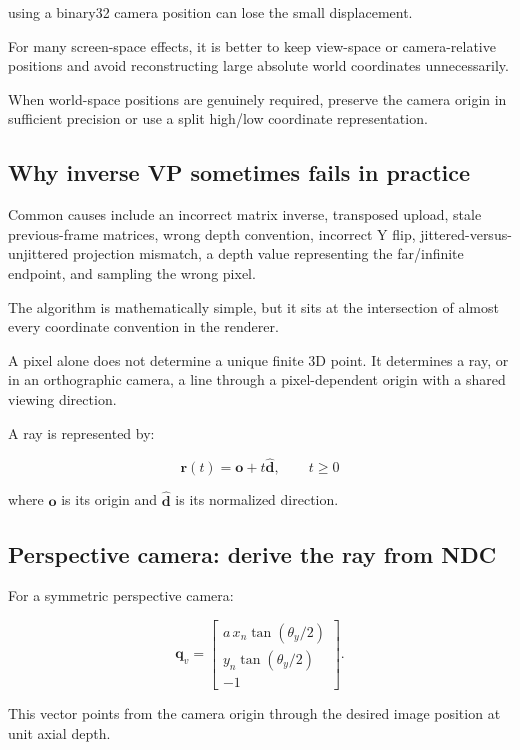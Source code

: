 using a binary32 camera position can lose the small displacement.

For many screen-space effects, it is better to keep view-space or camera-relative positions and avoid reconstructing large absolute world coordinates unnecessarily.

When world-space positions are genuinely required, preserve the camera origin in sufficient precision or use a split high/low coordinate representation.

\subsection{Why inverse VP sometimes fails in practice}\label{02-foundations-ii-ch035-why-inverse-vp-sometimes-fails-in-practice}

Common causes include an incorrect matrix inverse, transposed upload, stale previous-frame matrices, wrong depth convention, incorrect Y flip, jittered-versus-unjittered projection mismatch, a depth value representing the far/infinite endpoint, and sampling the wrong pixel.

The algorithm is mathematically simple, but it sits at the intersection of almost every coordinate convention in the renderer.

A pixel alone does not determine a unique finite 3D point. It determines a ray, or in an orthographic camera, a line through a pixel-dependent origin with a shared viewing direction.

A ray is represented by:

\[ \boxed{ \mathbf r(t)=\mathbf o+t\hat{\mathbf d}, \qquad t\ge0 } \]

where \(\mathbf o\) is its origin and \(\hat{\mathbf d}\) is its normalized direction.

\subsection{Perspective camera: derive the ray from NDC}\label{02-foundations-ii-ch035-perspective-camera-derive-the-ray-from-ndc}

For a symmetric perspective camera:

\[ \mathbf q_v= \begin{bmatrix} a\,x_n\tan(\theta_y/2)\\ y_n\tan(\theta_y/2)\\ -1 \end{bmatrix}. \]

This vector points from the camera origin through the desired image position at unit axial depth.

